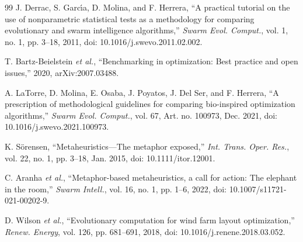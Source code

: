 {\begin{thebibliography}{99}
J. Derrac, S. Garc\'{\i}a, D. Molina, and F. Herrera, ``A practical tutorial on the use of nonparametric statistical tests as a methodology for comparing evolutionary and swarm intelligence algorithms,'' \textit{Swarm Evol. Comput.}, vol. 1, no. 1, pp. 3--18, 2011, doi: 10.1016/j.swevo.2011.02.002.

T. Bartz-Beielstein \textit{et al.}, ``Benchmarking in optimization: Best practice and open issues,'' 2020, arXiv:2007.03488.

A. LaTorre, D. Molina, E. Osaba, J. Poyatos, J. Del Ser, and F. Herrera, ``A prescription of methodological guidelines for comparing bio-inspired optimization algorithms,'' \textit{Swarm Evol. Comput.}, vol. 67, Art. no. 100973, Dec. 2021, doi: 10.1016/j.swevo.2021.100973.

K. S\"orensen, ``Metaheuristics---The metaphor exposed,'' \textit{Int. Trans. Oper. Res.}, vol. 22, no. 1, pp. 3--18, Jan. 2015, doi: 10.1111/itor.12001.

C. Aranha \textit{et al.}, ``Metaphor-based metaheuristics, a call for action: The elephant in the room,'' \textit{Swarm Intell.}, vol. 16, no. 1, pp. 1--6, 2022, doi: 10.1007/s11721-021-00202-9.

D. Wilson \textit{et al.}, ``Evolutionary computation for wind farm layout optimization,'' \textit{Renew. Energy}, vol. 126, pp. 681--691, 2018, doi: 10.1016/j.renene.2018.03.052.


\end{thebibliography}}
